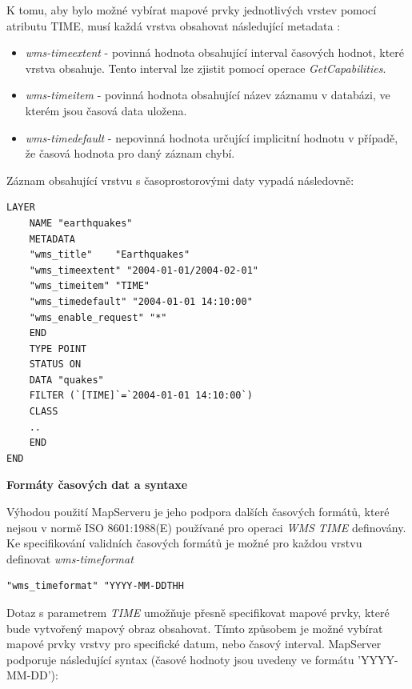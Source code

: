 K tomu, aby bylo možné vybírat mapové prvky jednotlivých vrstev pomocí atributu
TIME, musí každá vrstva obsahovat následující metadata
\cite{mapserver_about}:

\begin{itemize}
\item\textit{wms-timeextent} - povinná hodnota obsahující interval
  časových hodnot, které vrstva obsahuje. Tento interval lze zjistit
  pomocí operace \textit{GetCapabilities}.
\item\textit{wms-timeitem} - povinná hodnota obsahující název záznamu
  v databázi, ve kterém jsou časová data uložena.
\item\textit{wms-timedefault} - nepovinná hodnota určující implicitní
  hodnotu v případě, že časová hodnota pro daný záznam chybí.
\end{itemize}

\noindent
Záznam obsahující vrstvu s časoprostorovými daty vypadá následovně:

\begin{verbatim}
LAYER
	NAME "earthquakes"
	METADATA
	"wms_title"    "Earthquakes"
	"wms_timeextent" "2004-01-01/2004-02-01"
	"wms_timeitem" "TIME"
	"wms_timedefault" "2004-01-01 14:10:00"
	"wms_enable_request" "*"
	END
	TYPE POINT
	STATUS ON
	DATA "quakes"
	FILTER (`[TIME]`=`2004-01-01 14:10:00`)
	CLASS
	..
	END
END
\end{verbatim}

\bigskip
\noindent
\textbf{Formáty časových dat a syntaxe}

Výhodou použití MapServeru je jeho podpora dalších časových formátů,
které nejsou v normě ISO 8601:1988(E) používané pro operaci
\textit{WMS TIME} definovány. Ke specifikování validních časových
formátů je možné pro každou vrstvu definovat \textit{wms-timeformat}

\begin{verbatim}
"wms_timeformat" "YYYY-MM-DDTHH
\end{verbatim}

Dotaz s parametrem \textit{TIME} umožňuje přesně specifikovat
mapové prvky, které bude vytvořený mapový obraz obsahovat. Tímto způsobem je možné vybírat mapové prvky vrstvy pro specifické datum, nebo časový interval. MapServer
podporuje následující syntax (časové hodnoty jsou uvedeny ve formátu
'YYYY-MM-DD'):


